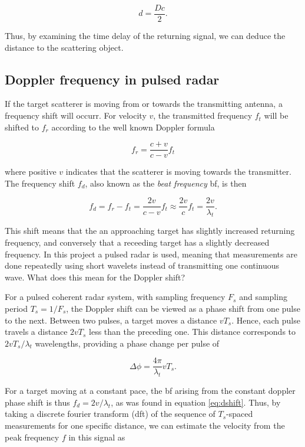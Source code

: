 \begin{equation}
	d = \frac{Dc}{2}.
\end{equation}

Thus, by examining the time delay of the returning signal, we can deduce the distance to the scattering object. 

\subsection{Doppler frequency in pulsed radar}\label{sec:doppler}
\label{doppler}

If the target scatterer is moving from or towards the transmitting antenna, a frequency shift will occurr. For velocity $v$, the transmitted frequency $f_t$ will be shifted to $f_r$ according to the well known Doppler formula \citep{ridenour_1947}

\begin{equation}
	f_r = \frac{c + v}{c - v}f_t
\end{equation}

where positive $v$ indicates that the scatterer is moving towards the transmitter. The frequency shift $f_d$, also known as the \emph{beat frequency} \gls{bf}, is then

\begin{equation}\label{eq:dshift}
	f_d 
	= f_r - f_t 
	= \frac{2v}{c-v}f_t \approx \frac{2v}{c}f_t 
	= \frac{2v}{\lambda_t}.
\end{equation}

This shift means that the an approaching target has slightly increased returning frequency, and conversely that a receeding target has a slightly decreased frequency. In this project a pulsed radar is used, meaning that measurements are done repeatedly using short wavelets instead of transmitting one continuous wave. What does this mean for the Doppler shift?

For a pulsed coherent radar system, with sampling frequency $F_s$ and sampling period $T_s = 1/F_s$, the Doppler shift can be viewed as a phase shift from one pulse to the next. Between two pulses, a target moves a distance $vT_s$. Hence, each pulse travels a distance $2vT_s$ less than the preceding one. This distance corresponds to $2vT_s/\lambda_t$ wavelengths, providing a phase change per pulse of

\begin{equation}
	\Delta \phi = \frac{4\pi}{\lambda_t}vT_s.
\end{equation}

For a target moving at a constant pace, the \gls{bf} arising from the constant doppler phase shift is thus $f_d = 2v/\lambda_t$, as was found in equation \ref{eq:dshift}. Thus, by taking a discrete fourier transform (\gls{dft}) of the sequence of $T_s$-spaced measurements for one specific distance, we can estimate the velocity from the peak frequency $f$ in this signal as 

